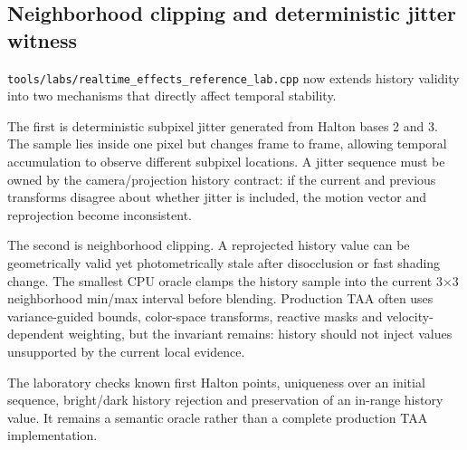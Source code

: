\subsection{Neighborhood clipping and deterministic jitter witness}\label{appendix-0727340a4428-neighborhood-clipping-and-deterministic-jitter-witness}

\texttt{tools/labs/realtime\_effects\_reference\_lab.cpp} now extends history validity into two mechanisms that directly affect temporal stability.

The first is deterministic subpixel jitter generated from Halton bases 2 and 3. The sample lies inside one pixel but changes frame to frame, allowing temporal accumulation to observe different subpixel locations. A jitter sequence must be owned by the camera/projection history contract: if the current and previous transforms disagree about whether jitter is included, the motion vector and reprojection become inconsistent.

The second is neighborhood clipping. A reprojected history value can be geometrically valid yet photometrically stale after disocclusion or fast shading change. The smallest CPU oracle clamps the history sample into the current 3×3 neighborhood min/max interval before blending. Production TAA often uses variance-guided bounds, color-space transforms, reactive masks and velocity-dependent weighting, but the invariant remains: history should not inject values unsupported by the current local evidence.

The laboratory checks known first Halton points, uniqueness over an initial sequence, bright/dark history rejection and preservation of an in-range history value. It remains a semantic oracle rather than a complete production TAA implementation.
